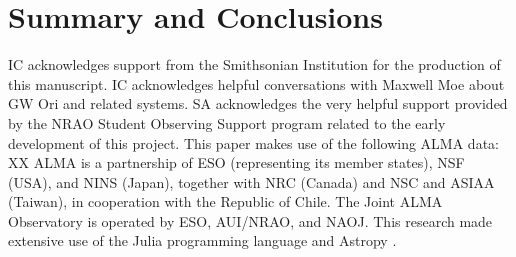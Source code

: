 \documentclass[twocolumn]{aastex61}
\begin{document}
\section{Summary and Conclusions} \label{sec:summary}

\acknowledgments
IC acknowledges support from the Smithsonian Institution for the production of this manuscript. IC acknowledges helpful conversations with Maxwell Moe about GW Ori and related systems.  SA acknowledges the very helpful support provided by the NRAO Student Observing Support program related to the early development of this project.  This paper makes use of the following ALMA data: XX  ALMA is a partnership of ESO (representing its member states), NSF (USA), and NINS (Japan), together with NRC (Canada) and NSC and ASIAA (Taiwan), in cooperation with the Republic of Chile.  The Joint ALMA Observatory is operated by ESO, AUI/NRAO, and NAOJ.  This research made extensive use of the Julia programming language \citep{julia12} and Astropy \citep{astropy13}.



\end{document}
